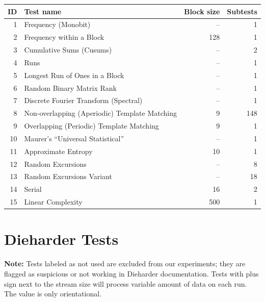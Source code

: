 \documentclass[
  digital,  	%
  color,		%
  oneside,   	%
  12pt,
  nocover,
  notable,
  nolof,
  nolot,
]{fithesis3}
\theoremstyle{definition}
\theoremstyle{remark}
\begin{document}
\begin{nomar}
\centering
\begin{tabular}{@{}rlrr@{}} \toprule
\textbf{ID} & \textbf{Test name} & \textbf{Block size} & \textbf{Subtests} \\ \midrule
1  & Frequency (Monobit)                           & --  & 1 \\
2  & Frequency within a Block                      & 128 & 1 \\
3  & Cumulative Sums (Cusums)	                   & --  & 2 \\
4  & Runs                                          & --  & 1 \\
5  & Longest Run of Ones in a Block                & --  & 1 \\
6  & Random Binary Matrix Rank                     & --  & 1 \\
7  & Discrete Fourier Transform (Spectral)         & --  & 1 \\
8  & Non-overlapping (Aperiodic) Template Matching & 9   & 148 \\
9  & Overlapping (Periodic) Template Matching      & 9   & 1 \\
10 & Maurer's “Universal Statistical” 	           & --  & 1 \\
11 & Approximate Entropy 	                       & 10  & 1 \\
12 & Random Excursions 	                           & --  & 8 \\
13 & Random Excursions Variant	                   & --  & 18 \\
14 & Serial                                        & 16  & 2 \\
15 & Linear Complexity	                           & 500 & 1 \\ \bottomrule
\end{tabular}
\end{nomar}

\chapter{Dieharder Tests}
\label{app:dieharder_tests}
\textbf{Note:} Tests labeled as not used are excluded from our experiments; they are flagged as suspicious or not working in Dieharder documentation. Tests with plus sign next to the stream size will process variable amount of data on each run. The value is only orientational.
\end{document}
